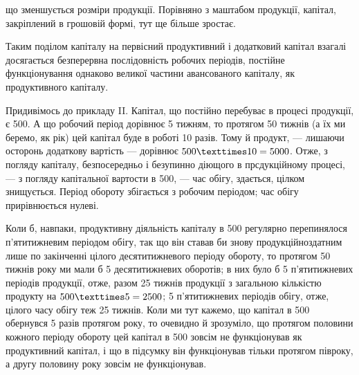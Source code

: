 \parcont{}  %
що зменшується розміри продукції. Порівняно з маштабом продукції, капітал,
закріплений в грошовій формі, тут ще більше зростає.

Таким поділом капіталу на первісний продуктивний і додатковий капітал
взагалі досягається безперервна послідовність робочих періодів, постійне
функціонування однаково великої частини авансованого капіталу,
як продуктивного капіталу.

Придивімось до прикладу II. Капітал, що постійно перебуває в процесі
продукції, є 500. А що робочий період дорівнює 5 тижням,
то протягом 50 тижнів (а їх ми беремо, як рік) цей капітал буде в
роботі 10 разів. Тому й продукт, — лишаючи осторонь додаткову вартість
— дорівнює $500 × 10 \deq{} 5000$. Отже, з погляду капіталу,
безпосередньо і безупинно діющого в прсдукційному процесі, — з погляду
капітальної вартости в 500, — час обігу, здається, цілком
знищується. Період обороту збігається з робочим періодом; час обігу прирівнюється
нулеві.

Коли б, навпаки, продуктивну діяльність капіталу в 500 регулярно
перепинялося п’ятитижневим періодом обігу, так що він ставав
би знову продукційноздатним лише по закінченні цілого десятитижневого
періоду обороту, то протягом 50 тижнів року ми мали б 5 десятитижневих
оборотів; в них було б 5 п’ятитижневих періодів продукції, отже,
разом 25 тижнів продукції з загальною кількістю продукту на $500 × 5 \deq{} 2500$; 5 п’ятитижневих періодів обігу, отже, цілого часу обігу теж
25 тижнів. Коли ми тут кажемо, що капітал в 500 обернувся
5 разів протягом року, то очевидно й зрозуміло, що протягом половини
кожного періоду обороту цей капітал в 500 зовсім не функціонував
як продуктивний капітал, і що в підсумку він функціонував тільки
протягом півроку, а другу половину року зовсім не функціонував.

